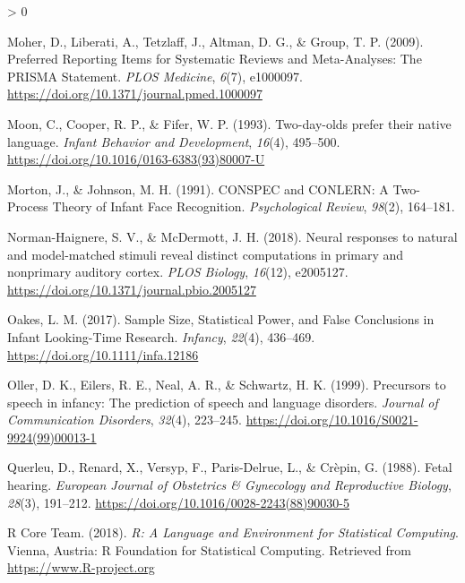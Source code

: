 \documentclass[
  english,
  man]{apa6}
\newlength{\cslhangindent}
\newenvironment{CSLReferences}[2] %
 {%
  \setlength{\parindent}{0pt}
  \ifodd #1 \everypar{\setlength{\hangindent}{\cslhangindent}}\ignorespaces\fi
  \ifnum #2 > 0
  \setlength{\parskip}{#2\baselineskip}
  \fi
 }%
 {}
\begin{document}
\begin{CSLReferences}{1}{0}
\leavevmode\hypertarget{ref-moher_preferred_2009}{}%
Moher, D., Liberati, A., Tetzlaff, J., Altman, D. G., \& Group, T. P. (2009). Preferred {Reporting} {Items} for {Systematic} {Reviews} and {Meta}-{Analyses}: {The} {PRISMA} {Statement}. \emph{PLOS Medicine}, \emph{6}(7), e1000097. \url{https://doi.org/10.1371/journal.pmed.1000097}

\leavevmode\hypertarget{ref-moon_two-day-olds_1993}{}%
Moon, C., Cooper, R. P., \& Fifer, W. P. (1993). Two-day-olds prefer their native language. \emph{Infant Behavior and Development}, \emph{16}(4), 495--500. \url{https://doi.org/10.1016/0163-6383(93)80007-U}

\leavevmode\hypertarget{ref-morton_conspec_1991}{}%
Morton, J., \& Johnson, M. H. (1991). {CONSPEC} and {CONLERN}: {A} {Two}-{Process} {Theory} of {Infant} {Face} {Recognition}. \emph{Psychological Review}, \emph{98}(2), 164--181.

\leavevmode\hypertarget{ref-norman-haignere_neural_2018}{}%
Norman-Haignere, S. V., \& McDermott, J. H. (2018). Neural responses to natural and model-matched stimuli reveal distinct computations in primary and nonprimary auditory cortex. \emph{PLOS Biology}, \emph{16}(12), e2005127. \url{https://doi.org/10.1371/journal.pbio.2005127}

\leavevmode\hypertarget{ref-oakes_sample_2017}{}%
Oakes, L. M. (2017). Sample {Size}, {Statistical} {Power}, and {False} {Conclusions} in {Infant} {Looking}-{Time} {Research}. \emph{Infancy}, \emph{22}(4), 436--469. \url{https://doi.org/10.1111/infa.12186}

\leavevmode\hypertarget{ref-oller_precursors_1999}{}%
Oller, D. K., Eilers, R. E., Neal, A. R., \& Schwartz, H. K. (1999). Precursors to speech in infancy: {The} prediction of speech and language disorders. \emph{Journal of Communication Disorders}, \emph{32}(4), 223--245. \url{https://doi.org/10.1016/S0021-9924(99)00013-1}

\leavevmode\hypertarget{ref-querleu_fetal_1988}{}%
Querleu, D., Renard, X., Versyp, F., Paris-Delrue, L., \& Crèpin, G. (1988). Fetal hearing. \emph{European Journal of Obstetrics \& Gynecology and Reproductive Biology}, \emph{28}(3), 191--212. \url{https://doi.org/10.1016/0028-2243(88)90030-5}

\leavevmode\hypertarget{ref-r_core_team_r:_2018}{}%
R Core Team. (2018). \emph{R: {A} {Language} and {Environment} for {Statistical} {Computing}}. Vienna, Austria: R Foundation for Statistical Computing. Retrieved from \url{https://www.R-project.org}


\end{CSLReferences}
\end{document}

